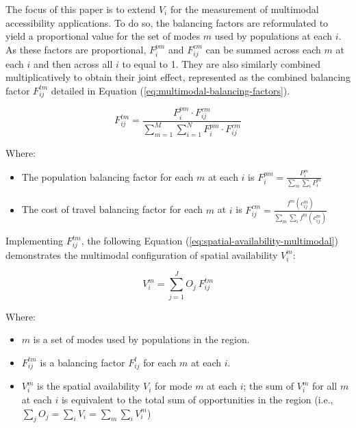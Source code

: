 \documentclass[10pt,letterpaper]{article}
\providecommand{\tightlist}{%
  \setlength{\itemsep}{0pt}\setlength{\parskip}{0pt}}
\begin{document}
The focus of this paper is to extend \(V_i\) for the measurement of
multimodal accessibility applications. To do so, the balancing factors
are reformulated to yield a proportional value for the set of modes
\(m\) used by populations at each \(i\). As these factors are
proportional, \(F^{pm}_{i}\) and \(F^{cm}_{ij}\) can be summed across
each \(m\) at each \(i\) and then across all \(i\) to equal to 1. They
are also similarly combined multiplicatively to obtain their joint
effect, represented as the combined balancing factor \(F^{tm}_{ij}\)
detailed in Equation (\ref{eq:multimodal-balancing-factors}).

\begin{equation}
\label{eq:multimodal-balancing-factors}
F^{tm}_{ij} = \frac{F^{pm}_{i} \cdot F^{cm}_{ij}}{\sum_{m=1}^M \sum_{i=1}^N F^{pm}_{i} \cdot F^{cm}_{ij}}
\end{equation}

\noindent Where:

\begin{itemize}
\tightlist
\item
  The population balancing factor for each \(m\) at each \(i\) is
  \(F^{pm}_{i} = \frac{P_{i}^m}{\sum_{m}\sum_{i} P_{i}^m}\)
\item
  The cost of travel balancing factor for each \(m\) at \(i\) is
  \(F_{ij}^{cm} = \frac{f^m(c_{ij}^m)}{\sum_{m} \sum_{i} f^m(c_{ij}^m)}\)
\end{itemize}

Implementing \(F^{tm}_{ij}\), the following Equation
(\ref{eq:spatial-availability-multimodal}) demonstrates the multimodal
configuration of spatial availability \(V_i^m\):

\begin{equation}
\label{eq:spatial-availability-multimodal}
V^m_{i} = \sum_{j=1}^J O_j\ F^{tm}_{ij}
\end{equation}

\noindent Where:

\begin{itemize}
\tightlist
\item
  \(m\) is a set of modes used by populations in the region.
\item
  \(F^{tm}_{ij}\) is a balancing factor \(F^t_{ij}\) for each \(m\) at
  each \(i\).
\item
  \(V^m_{i}\) is the spatial availability \(V_{i}\) for mode \(m\) at
  each \(i\); the sum of \(V^m_{i}\) for all \(m\) at each \(i\) is
  equivalent to the total sum of opportunities in the region (i.e.,
  \(\sum_j O_j = \sum_i V_i = \sum_{m} \sum_{i} V^m_{i}\))
\end{itemize}
\end{document}

